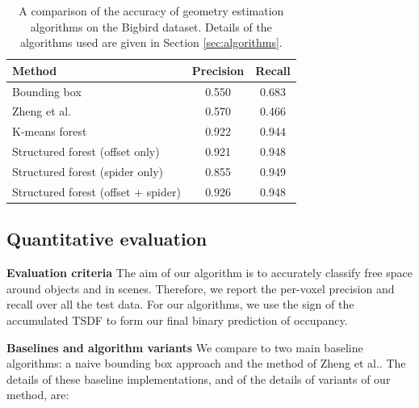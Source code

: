 \documentclass[10pt,twocolumn,letterpaper]{article}
\makeatletter
\newcommand*{\ea}{et al.\@\xspace}
\renewcommand{\paragraph}{\vspace{2pt}\noindent\textbf}
\makeatother
\begin{document}


\begin{table}
  \centering
  \begin{tabular}{|p{4.8cm}|c|c|}
  \hline
  \textbf{Method}  &   \textbf{Precision} & \textbf{Recall} \\
  \hline
  Bounding box & 0.550 & 0.683  \\
  Zheng \ea \cite{zheng-cvpr-2013}  & 0.570 & 0.466 \\
  K-means forest & 0.922 & 0.944 \\
  Structured forest (offset only) & 0.921 & 0.948 \\
  Structured forest (spider only) &  0.855 & 0.949 \\
  Structured forest (offset + spider) & 0.926 & 0.948 \\
  \hline
  \end{tabular}
  \vspace{5pt}
  \caption{A comparison of the accuracy of geometry estimation algorithms on the Bigbird dataset. Details of the algorithms used are given in Section \ref{sec:algorithms}.}
    \label{tab:quant_results}
\end{table}


\subsection{Quantitative evaluation}

\paragraph{Evaluation criteria}
The aim of our algorithm is to accurately classify free space around objects and in scenes.
Therefore, we report the per-voxel precision and recall over all the test data.
For our algorithms, we use the sign of the accumulated TSDF to form our final binary prediction of occupancy.



\paragraph{Baselines and algorithm variants}
\label{sec:algorithms}
We compare to two main baseline algorithms: a naive bounding box approach and the method of Zheng \ea \cite{zheng-cvpr-2013}.
The details of these baseline implementations, and of the details of variants of our method, are:
\end{document}
